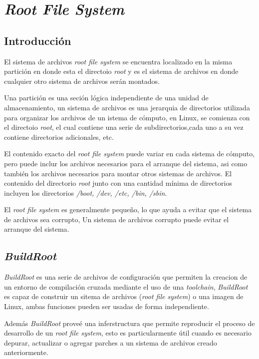 \chapter{\emph{Root File System}}


\section{Introducción}

El sistema de archivos \emph{root file system} se encuentra localizado en la
misma partición en donde esta el directoio \emph{root} y es el sistema de
archivos en donde cualquier otro sistema de archivos serán montados.

Una partición es una seción lógica independiente de una unidad de
almacenamiento, un sistema de archivos es una jerarquia de directorios
utilizada para organizar los archivos de un istema de cómputo, en Linux, se
comienza con el directoio \emph{root}, el cual contiene una serie de
subdirectorios,cada uno  a su vez contiene directorios adicionales, etc. 


El contenido exacto del \emph{root file system}  puede variar en cada sistema
de cómputo, pero puede inclur los archivos necesarios para el arranque del
sistema, asi como también los archivos necesarios para montar otros sistemas de
archivos. El contenido del directorio \emph{root} junto con una cantidad mínima
de directorios incluyen los directorios \emph{/boot, /dev, /etc, /bin, /sbin}.

El  \emph{root file system} es generalmente pequeño, lo que ayuda a evitar que
el sistema de archivos sea corrupto, Un sistema de archivos corrupto puede
evitar el arranque del sistema\cite{rootfs}.

\section{\emph{BuildRoot}}

\emph{BuildRoot} es una serie de archivos de configuración que permiten la
creacion de un entorno de compilación cruzada mediante el uso de una
\emph{toolchain}, \emph{BuildRoot} es capaz de construir un sitema de archivos
(\emph{root file system}) o una imagen de Linux, ambas funciones pueden ser
usadas de forma independiente.

Además \emph{BuildRoot} proveé una inferstructura que permite reproducir el
proceso de desarrollo de un \emph{root file system}, esto es particularmente
útil cuando es necesario depurar, actualizar o agregar parches a un sistema de
archivos creado anteriormente\cite{buildroot}.

